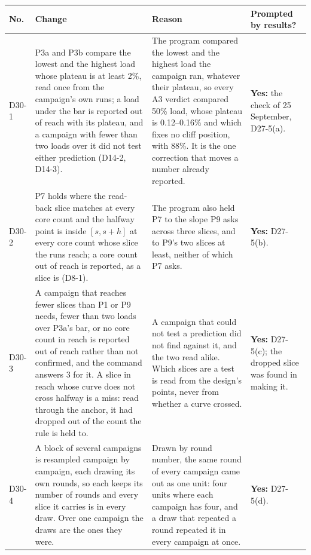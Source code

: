 \documentclass[11pt]{article}
\begin{document}
{\small
\begin{longtable}{@{}p{1.1cm} >{\raggedright\arraybackslash}p{6.1cm} >{\raggedright\arraybackslash}p{6.0cm} >{\raggedright\arraybackslash}p{2.2cm}@{}}
\toprule
\textbf{No.} & \textbf{Change} & \textbf{Reason} & \textbf{Prompted by results?} \\
\midrule
\endhead
D30-1 & P3a and P3b compare the lowest and the highest load whose plateau is at least 2\%, read once from the campaign's own runs; a load under the bar is reported out of reach with its plateau, and a campaign with fewer than two loads over it did not test either prediction (D14-2, D14-3). & The program compared the lowest and the highest load the campaign ran, whatever their plateau, so every A3 verdict compared 50\% load, whose plateau is 0.12--0.16\% and which fixes no cliff position, with 88\%. It is the one correction that moves a number already reported. & \textbf{Yes:} the check of 25 September, D27-5(a). \\
D30-2 & P7 holds where the read-back slice matches at every core count and the halfway point is inside $[s, s+h]$ at every core count whose slice the runs reach; a core count out of reach is reported, as a slice is (D8-1). & The program also held P7 to the slope P9 asks across three slices, and to P9's two slices at least, neither of which P7 asks. & \textbf{Yes:} D27-5(b). \\
D30-3 & A campaign that reaches fewer slices than P1 or P9 needs, fewer than two loads over P3a's bar, or no core count in reach is reported out of reach rather than not confirmed, and the command answers 3 for it. A slice in reach whose curve does not cross halfway is a miss: read through the anchor, it had dropped out of the count the rule is held to. & A campaign that could not test a prediction did not find against it, and the two read alike. Which slices are a test is read from the design's points, never from whether a curve crossed. & \textbf{Yes:} D27-5(c); the dropped slice was found in making it. \\
D30-4 & A block of several campaigns is resampled campaign by campaign, each drawing its own rounds, so each keeps its number of rounds and every slice it carries is in every draw. Over one campaign the draws are the ones they were. & Drawn by round number, the same round of every campaign came out as one unit: four units where each campaign has four, and a draw that repeated a round repeated it in every campaign at once. & \textbf{Yes:} D27-5(d). \\

\end{longtable}}
\end{document}
